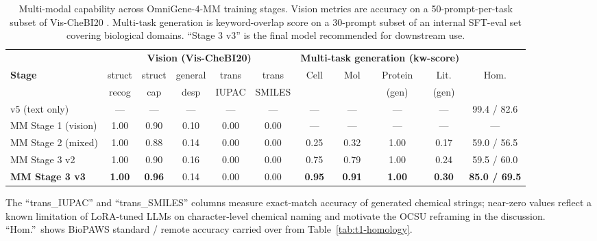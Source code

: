 \begin{table}[t]
\centering
\small
\caption{Multi-modal capability across OmniGene-4-MM training stages. Vision
metrics are accuracy on a 50-prompt-per-task subset of Vis-CheBI20
\citep{fan2025ocsu}. Multi-task generation is keyword-overlap score on a
30-prompt subset of an internal SFT-eval set covering biological domains.
``Stage 3 v3'' is the final model recommended for downstream use.}
\label{tab:t2-multimodal}
\begin{tabular}{l c c c c c c c c c c}
\toprule
& \multicolumn{5}{c}{\textbf{Vision (Vis-CheBI20)}} & \multicolumn{4}{c}{\textbf{Multi-task generation (kw-score)}} & \\
\cmidrule(lr){2-6} \cmidrule(lr){7-10}
\textbf{Stage} & struct & struct & general & trans & trans & Cell & Mol & Protein & Lit. & Hom. \\
               & recog  & cap    & desp    & IUPAC & SMILES &      &     & (gen)   & (gen)& \\
\midrule
v5 (text only)        & ---    & ---  & ---  & ---  & ---  & ---  & ---  & ---  & ---  & 99.4 / 82.6 \\
MM Stage 1 (vision)   & 1.00   & 0.90 & 0.10 & 0.00 & 0.00 & ---  & ---  & ---  & ---  & --- \\
MM Stage 2 (mixed)    & 1.00   & 0.88 & 0.14 & 0.00 & 0.00 & 0.25 & 0.32 & 1.00 & 0.17 & 59.0 / 56.5 \\
MM Stage 3 v2         & 1.00   & 0.90 & 0.16 & 0.00 & 0.00 & 0.75 & 0.79 & 1.00 & 0.24 & 59.5 / 60.0 \\
\textbf{MM Stage 3 v3} & \textbf{1.00} & \textbf{0.96} & 0.14 & 0.00 & 0.00 & \textbf{0.95} & \textbf{0.91} & \textbf{1.00} & \textbf{0.30} & \textbf{85.0 / 69.5} \\
\bottomrule
\end{tabular}

\vspace{1ex}
\footnotesize
The ``trans\_IUPAC'' and ``trans\_SMILES'' columns measure exact-match accuracy
of generated chemical strings; near-zero values reflect a known limitation of
LoRA-tuned LLMs on character-level chemical naming and motivate the OCSU
\citep{fan2025ocsu} reframing in the discussion. ``Hom.''\ shows BioPAWS
standard / remote accuracy carried over from Table~\ref{tab:t1-homology}.
\end{table}


